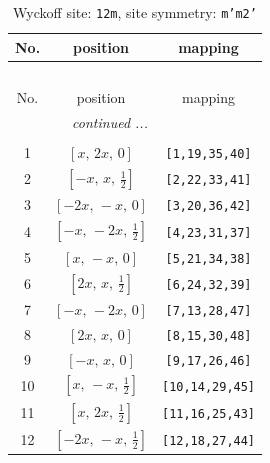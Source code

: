 \documentclass[fleqn,8pt]{jsarticle}
\begin{document}
\begin{longtable}{ccc}
\caption{Wyckoff site: {\tt 12m}, site symmetry: {\tt m'm2'}}
 \\
 \hline \hline
No. & position & mapping \\ \hline \endfirsthead

\multicolumn{2}{l}{\tablename\ \thetable{}} \\
 \hline \hline
No. & position & mapping \\ \hline \endhead

 \hline \hline
\multicolumn{2}{r}{\footnotesize\it continued ...} \\ \endfoot

 \hline \hline
\multicolumn{2}{r}{} \\ \endlastfoot

1 & $\left[ x,\, 2 x,\, 0 \right]$ & {\tt [1,19,35,40]} \\ \hline
2 & $\left[ - x,\, x,\, \frac{1}{2} \right]$ & {\tt [2,22,33,41]} \\ \hline
3 & $\left[ - 2 x,\, - x,\, 0 \right]$ & {\tt [3,20,36,42]} \\ \hline
4 & $\left[ - x,\, - 2 x,\, \frac{1}{2} \right]$ & {\tt [4,23,31,37]} \\ \hline
5 & $\left[ x,\, - x,\, 0 \right]$ & {\tt [5,21,34,38]} \\ \hline
6 & $\left[ 2 x,\, x,\, \frac{1}{2} \right]$ & {\tt [6,24,32,39]} \\ \hline
7 & $\left[ - x,\, - 2 x,\, 0 \right]$ & {\tt [7,13,28,47]} \\ \hline
8 & $\left[ 2 x,\, x,\, 0 \right]$ & {\tt [8,15,30,48]} \\ \hline
9 & $\left[ - x,\, x,\, 0 \right]$ & {\tt [9,17,26,46]} \\ \hline
10 & $\left[ x,\, - x,\, \frac{1}{2} \right]$ & {\tt [10,14,29,45]} \\ \hline
11 & $\left[ x,\, 2 x,\, \frac{1}{2} \right]$ & {\tt [11,16,25,43]} \\ \hline
12 & $\left[ - 2 x,\, - x,\, \frac{1}{2} \right]$ & {\tt [12,18,27,44]} \\
\end{longtable}
\renewcommand{\arraystretch}{1.2}
\end{document}
